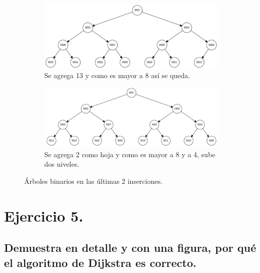 \documentclass[12pt]{article}
\begin{document}
\begin{figure}
\begin{subfigure}{.9\textwidth}
	\centering
	\includegraphics[width=1.2\linewidth]{hp014}
	\caption{Se agrega 13 y como es mayor a 8 así se queda. }
	\label{fig:sfig14}
\end{subfigure}
\begin{subfigure}{.9\textwidth}
	\centering
	\includegraphics[width=1.2\linewidth]{hp015}
	\caption{Se agrega 2 como hoja y como es mayor a 8 y a 4, sube dos niveles.}
	\label{fig:sfig15}
\end{subfigure}
	\caption{Árboles binarios en las últimas 2 inserciones.}
	\label{fig:fig__}
\end{figure}
\pagebreak
\section{Ejercicio 5.}
\subsection{Demuestra en detalle y con una figura, por qué el algoritmo de Dijkstra es correcto.}
\end{document}
